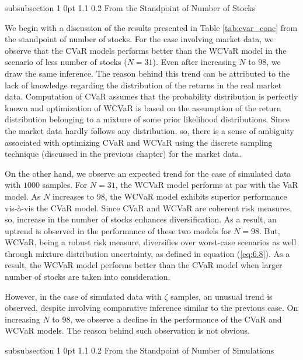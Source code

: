 \documentclass[12pt]{article}
\makeatletter
\numberwithin{equation}{section}
\renewcommand{\subsubsection}{
  \@startsection
  {subsubsection}%
  {1}%
  {0pt}%
  {1.1\baselineskip}%
  {0.2\baselineskip}%
  {\sc \centering}%
}
\makeatother
\begin{document}
\subsubsection{From the Standpoint of Number of Stocks}

We begin with a discussion of the results presented in Table \ref{tab:cvar_conc} from the standpoint of number of stocks. For the case involving market data, we observe that the CVaR models performs better than the WCVaR model in the scenario of less number of stocks ($N=31$). Even after increasing $N$ to 98, we draw the same inference. The reason behind this trend can be attributed to the lack of knowledge regarding the distribution of the returns in the real market data. Computation of CVaR assumes that the probability distribution is perfectly known and optimization of WCVaR is based on the assumption of the return distribution belonging to a mixture of some prior likelihood distributions. Since the market data hardly follows any distribution, so, there is a sense of ambiguity associated with optimizing CVaR and WCVaR using the discrete sampling technique (discussed in the previous chapter) for the market data. 

On the other hand, we observe an expected trend for the case of simulated data with $1000$ samples. For $N=31$, the WCVaR model performs at par with the VaR model. As $N$ increases to $98$, the WCVaR model exhibits superior performance vis-\`a-vis the CVaR model. Since CVaR and WCVaR are coherent risk measures, so, increase in the number of stocks enhances diversification. As a result, an uptrend is observed in the performance of these two models for $N=98$. But, WCVaR, being a robust risk measure, diversifies over worst-case scenarios as well through mixture distribution uncertainty, as defined in equation (\ref{eq:6.8}). As a result, the WCVaR model performs better than the CVaR model when larger number of stocks are taken into consideration.

However, in the case of simulated data with $\zeta$ samples, an unusual trend is observed, despite involving comparative inference similar to the previous case. On increasing $N$ to 98, we observe a decline in the performance of the CVaR and WCVaR models. The reason behind such observation is not obvious.






\subsubsection{From the Standpoint of Number of Simulations}
\end{document}
